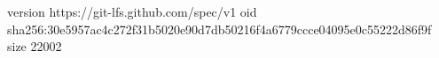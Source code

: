 version https://git-lfs.github.com/spec/v1
oid sha256:30e5957ac4c272f31b5020e90d7db50216f4a6779ccce04095e0c55222d86f9f
size 22002
